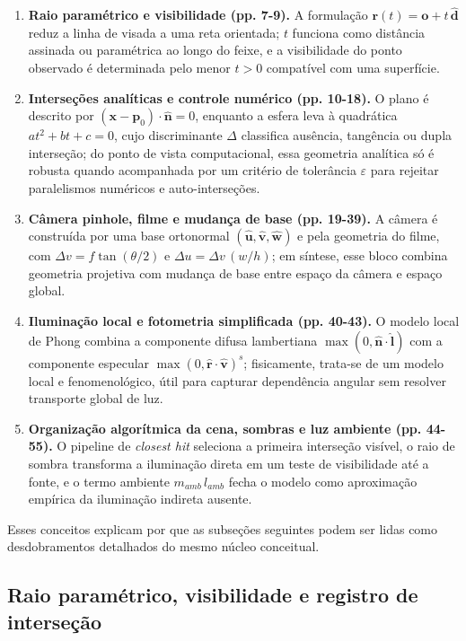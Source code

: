 \documentclass[portuguese]{sbcreviews-2025}%
\begin{document}
\begin{enumerate}
    \item \textbf{Raio paramétrico e visibilidade (pp. 7-9).} A formulação $\mathbf{r}(t)=\mathbf{o}+t\,\hat{\mathbf{d}}$ reduz a linha de visada a uma reta orientada; $t$ funciona como distância assinada ou paramétrica ao longo do feixe, e a visibilidade do ponto observado é determinada pelo menor $t>0$ compatível com uma superfície.
    \item \textbf{Interseções analíticas e controle numérico (pp. 10-18).} O plano é descrito por $(\mathbf{x}-\mathbf{p}_0)\cdot\hat{\mathbf{n}}=0$, enquanto a esfera leva à quadrática $at^2+bt+c=0$, cujo discriminante $\Delta$ classifica ausência, tangência ou dupla interseção; do ponto de vista computacional, essa geometria analítica só é robusta quando acompanhada por um critério de tolerância $\varepsilon$ para rejeitar paralelismos numéricos e auto-interseções.
    \item \textbf{Câmera pinhole, filme e mudança de base (pp. 19-39).} A câmera é construída por uma base ortonormal $(\hat{\mathbf{u}},\hat{\mathbf{v}},\hat{\mathbf{w}})$ e pela geometria do filme, com $\Delta v = f\tan(\theta/2)$ e $\Delta u = \Delta v\,(w/h)$; em síntese, esse bloco combina geometria projetiva com mudança de base entre espaço da câmera e espaço global.
    \item \textbf{Iluminação local e fotometria simplificada (pp. 40-43).} O modelo local de Phong combina a componente difusa lambertiana $\max(0,\hat{\mathbf{n}}\cdot\hat{\mathbf{l}})$ com a componente especular $\max(0,\hat{\mathbf{r}}\cdot\hat{\mathbf{v}})^s$; fisicamente, trata-se de um modelo local e fenomenológico, útil para capturar dependência angular sem resolver transporte global de luz.
    \item \textbf{Organização algorítmica da cena, sombras e luz ambiente (pp. 44-55).} O pipeline de \emph{closest hit} seleciona a primeira interseção visível, o raio de sombra transforma a iluminação direta em um teste de visibilidade até a fonte, e o termo ambiente $m_{amb}\,l_{amb}$ fecha o modelo como aproximação empírica da iluminação indireta ausente.
\end{enumerate}

Esses conceitos explicam por que as subseções seguintes podem ser lidas como desdobramentos detalhados do mesmo núcleo conceitual.

\subsection{Raio paramétrico, visibilidade e registro de interseção}
\label{sec:slide4-raio}
\end{document}
